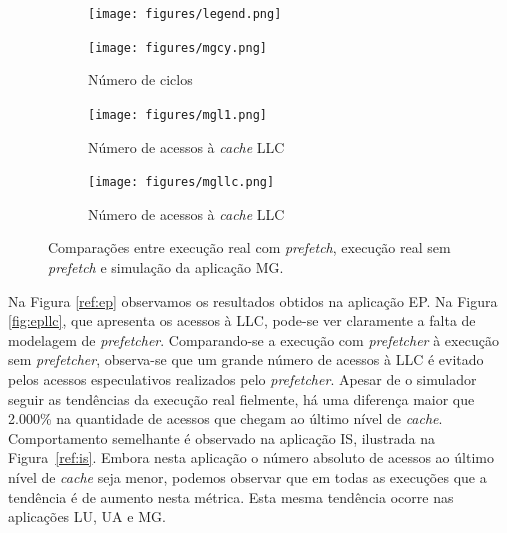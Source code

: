 \documentclass[12pt]{article}
\begin{document}
\begin{figure}[t!]
  \hspace{+25mm}
  \begin{subfigure}{0.33\textwidth}
    \centering
        \texttt{[image: figures/legend.png]}
    \label{fig:mgleg}
  \end{subfigure}
  \vspace{-5mm}

  \begin{subfigure}{0.33\textwidth}
    \centering
    \vspace{-4mm}
        \texttt{[image: figures/mgcy.png]}
    \caption{Número de ciclos}
    \label{fig:mgcycles}
  \end{subfigure}%
  \begin{subfigure}{0.33\textwidth}
    \centering	
        \texttt{[image: figures/mgl1.png]}
    \caption{Número de acessos à \textit{cache} LLC}
    \label{fig:mgl1}
  \end{subfigure}%
  \begin{subfigure}{0.33\textwidth}
    \centering	
        \texttt{[image: figures/mgllc.png]}
    \caption{Número de acessos à \textit{cache} LLC}
    \label{fig:mgllc}
  \end{subfigure}
  
  \caption{Comparações entre execução real com \textit{prefetch}, execução real sem \textit{prefetch} e simulação da aplicação MG.}
  \label{ref:mg}
\end{figure}

\vspace{-2mm}
Na Figura \ref{ref:ep} observamos os resultados obtidos na aplicação EP.
Na Figura \ref{fig:epllc}, que apresenta os acessos à LLC, pode-se ver claramente a falta de modelagem de \textit{prefetcher}.
Comparando-se a execução com \textit{prefetcher} à execução sem \textit{prefetcher}, observa-se que um grande número de acessos à LLC é evitado pelos acessos especulativos realizados pelo \textit{prefetcher}.
Apesar de o simulador seguir as tendências da execução real fielmente, há uma diferença maior que 2.000\% na quantidade de acessos que chegam ao último nível de \textit{cache}.
Comportamento semelhante é observado na aplicação IS, ilustrada na \mbox{Figura \ref{ref:is}}.
Embora nesta aplicação o número absoluto de acessos ao último nível de \textit{cache} seja menor, podemos observar que em todas as execuções que a tendência é de aumento nesta métrica.
Esta mesma tendência ocorre nas aplicações LU, UA e MG.
\end{document}
